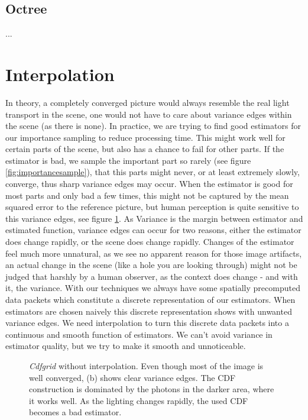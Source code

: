 \subsection{Octree}

...

\section{Interpolation}
\label{ch:interpolation}

In theory, a completely converged picture would always resemble the real light transport in the scene, one would not have to care about variance edges within the scene (as there is none). In practice, we are trying to find good estimators for our importance sampling to reduce processing time. This might work well for certain parts of the scene, but also has a chance to fail for other parts. If the estimator is bad, we sample the important part so rarely (see figure \ref{fig:importancesample}), that this parts might never, or at least extremely slowly, converge, thus sharp variance edges may occur. When the estimator is good for most parts and only bad a few times, this might not be captured by the mean squared error to the reference picture, but human perception is quite sensitive to this variance edges, see figure \ref{fig:varianceEdgeCdfgrid}. As Variance is the margin between estimator and estimated function, variance edges can occur for two reasons, either the estimator does change rapidly, or the scene does change rapidly. Changes of the estimator feel much more unnatural, as we see no apparent reason for those image artifacts, an actual change in the scene (like a hole you are looking through) might not be judged that harshly by a human observer, as the context does change - and with it, the variance. With our techniques we always have some spatially precomputed data packets which constitute a discrete representation of our estimators. When estimators are chosen naively this discrete representation shows with unwanted variance edges. We need interpolation to turn this discrete data packets into a continuous and smooth function of estimators. We can't avoid variance in estimator quality, but we try to make it smooth and unnoticeable.

\begin{figure}[htb] 
	\centering
    
    \caption{\textit{Cdfgrid} without interpolation. Even though most of the image is well converged, (b) shows clear variance edges. The CDF construction is dominated by the photons in the darker area, where it works well. As the lighting changes rapidly, the used CDF becomes a bad estimator.} 
    \label{fig:varianceEdgeCdfgrid}
\end{figure}

